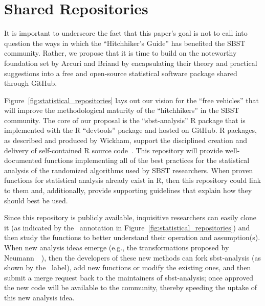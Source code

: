 
\vspace*{-.5em}

\section{Shared Repositories}
\label{sec:repositories}




It is important to underscore the fact that this paper's goal is not to call into question the ways in which the
``Hitchhiker's Guide'' has benefited the SBST community. Rather, we propose that it is time to build on the noteworthy
foundation set by Arcuri and Briand by encapsulating their theory and practical suggestions into a free and open-source
statistical software package shared through GitHub.

Figure~\ref{fig:statistical_repositories} lays out our vision for the ``free vehicles'' that will improve the
methodological maturity of the ``hitchhikers'' in the SBST community. The core of our proposal is the ``sbst-analysis''
R package that is implemented with the R ``devtools'' package and hosted on GitHub. R packages, as described and
produced by Wickham, support the disciplined creation and delivery of self-contained R source code~\cite{Wickham2015}.
This repository will provide well-documented functions implementing all of the best practices for the statistical
analysis of the randomized algorithms used by SBST researchers. When proven functions for statistical analysis already
exist in R, then this repository could link to them and, additionally, provide supporting guidelines that explain how
they should best be used.

Since this repository is publicly available, inquisitive researchers can easily clone it (as indicated by the
\codecopygit~annotation in Figure~\ref{fig:statistical_repositories}) and then study the functions to better understand
their operation and assumption(s). When new analysis ideas emerge (e.g., the transformations proposed by
Neumann~\etal~\cite{Neumann2015}), then the developers of these new methods can fork sbst-analysis (as shown by the
\codeforkgit~label), add new functions or modify the existing ones, and then submit a merge request back to the
maintainers of sbst-analysis; once approved the new code will be available to the community, thereby speeding the uptake
of this new analysis idea.

